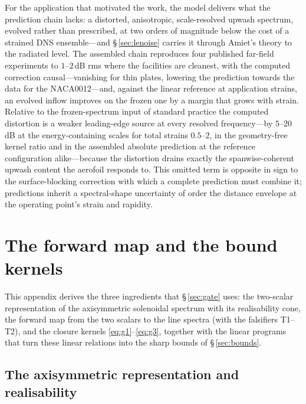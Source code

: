 \documentclass[lineno]{JFM-FLM_Au}
\begin{document}
For the application that motivated the work, the model delivers what
the prediction chain lacks: a distorted, anisotropic, scale-resolved
upwash spectrum, evolved rather than prescribed, at two orders of
magnitude below the cost of a strained DNS ensemble---and
\S\,\ref{sec:lenoise} carries it through Amiet's theory to the
radiated level. The assembled chain reproduces four published far-field experiments to
$1$--$2$\,dB rms where the facilities are cleanest, with the computed
correction causal---vanishing for thin plates, lowering the
prediction towards the data for the NACA0012---and, against the linear
reference at application strains, an evolved inflow improves on the frozen one by a margin that grows with strain. Relative to the
frozen-spectrum input of standard practice the computed distortion is
a weaker leading-edge source at every resolved frequency---by
$5$--$20$\,dB at the energy-containing scales for total strains
$0.5$--$2$, in the geometry-free kernel ratio and in the assembled
absolute prediction at the reference configuration alike---because the
distortion drains exactly the spanwise-coherent upwash content the
aerofoil responds to. This omitted term is opposite in sign to the surface-blocking correction with which a complete prediction must combine it; predictions inherit a spectral-shape uncertainty of order
the distance envelope at the operating point's strain and rapidity.

\appendix
\section{The forward map and the bound kernels}\label{app:forward}

This appendix derives the three ingredients that \S\,\ref{sec:gate} uses:
the two-scalar representation of the axisymmetric solenoidal spectrum with
its realisability cone, the forward map from the two scalars to the line
spectra (with the falsifiers T1--T2), and the closure kernels
\eqref{eq:g1}--\eqref{eq:g3}, together with the linear programs that turn
these linear relations into the sharp bounds of \S\,\ref{sec:bounds}.

\subsection{The axisymmetric representation and realisability}
\label{app:twoscalar}
\end{document}
